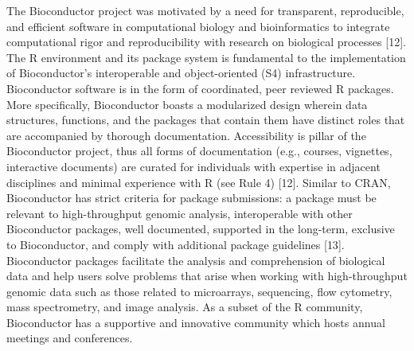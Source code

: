 \documentclass[10pt,letterpaper]{article}
\begin{document}
The Bioconductor project was motivated by a need for transparent,
reproducible, and efficient software in computational biology and
bioinformatics to integrate computational rigor and reproducibility with
research on biological processes {[}12{]}. The R environment and its
package system is fundamental to the implementation of Bioconductor's
interoperable and object-oriented (S4) infrastructure. Bioconductor
software is in the form of coordinated, peer reviewed R packages. More
specifically, Bioconductor boasts a modularized design wherein data
structures, functions, and the packages that contain them have distinct
roles that are accompanied by thorough documentation. Accessibility is
pillar of the Bioconductor project, thus all forms of documentation
(e.g., courses, vignettes, interactive documents) are curated for
individuals with expertise in adjacent disciplines and minimal
experience with R (see Rule 4) {[}12{]}. Similar to CRAN, Bioconductor
has strict criteria for package submissions: a package must be relevant
to high-throughput genomic analysis, interoperable with other
Bioconductor packages, well documented, supported in the long-term,
exclusive to Bioconductor, and comply with additional package guidelines
{[}13{]}. Bioconductor packages facilitate the analysis and
comprehension of biological data and help users solve problems that
arise when working with high-throughput genomic data such as those
related to microarrays, sequencing, flow cytometry, mass spectrometry,
and image analysis. As a subset of the R community, Bioconductor has a
supportive and innovative community which hosts annual meetings and
conferences.
\end{document}
